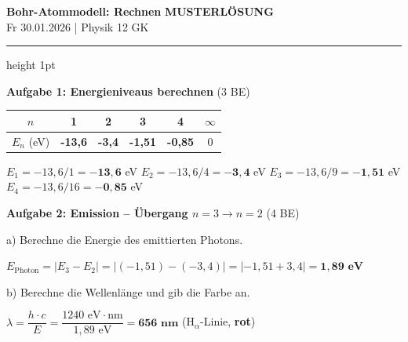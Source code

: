 \documentclass[11pt,a4paper]{article}
\begin{document}
{\Large\textbf{Bohr-Atommodell: Rechnen}} \hfill \textcolor{loesung}{\textbf{MUSTERLÖSUNG}}\\[0.3em]
{\normalsize Fr 30.01.2026 | Physik 12 GK}

\vspace{0.3em}
\hrule height 1pt
\vspace{0.6em}


\textbf{Aufgabe 1: Energieniveaus berechnen} \hfill (3 BE)

\begin{center}
\begin{tabular}{|c|c|c|c|c|c|}
\hline
$n$ & 1 & 2 & 3 & 4 & $\infty$ \\
\hline
$E_n$ (eV) & \textcolor{loesung}{\textbf{-13,6}} & \textcolor{loesung}{\textbf{-3,4}} & \textcolor{loesung}{\textbf{-1,51}} & \textcolor{loesung}{\textbf{-0,85}} & 0 \\
\hline
\end{tabular}
\end{center}

\begin{tcolorbox}[loesungbox]
$E_1 = -13{,}6/1 = \mathbf{-13{,}6}$ eV \quad
$E_2 = -13{,}6/4 = \mathbf{-3{,}4}$ eV \quad
$E_3 = -13{,}6/9 = \mathbf{-1{,}51}$ eV \quad
$E_4 = -13{,}6/16 = \mathbf{-0{,}85}$ eV
\end{tcolorbox}


\textbf{Aufgabe 2: Emission -- Übergang $n = 3 \to n = 2$} \hfill (4 BE)

a) Berechne die Energie des emittierten Photons.

\begin{tcolorbox}[loesungbox]
$E_{\text{Photon}} = |E_3 - E_2| = |(-1{,}51) - (-3{,}4)| = |-1{,}51 + 3{,}4| = \mathbf{1{,}89 \text{ eV}}$
\end{tcolorbox}

b) Berechne die Wellenlänge und gib die Farbe an.

\begin{tcolorbox}[loesungbox]
$\lambda = \dfrac{h \cdot c}{E} = \dfrac{1240 \text{ eV} \cdot \text{nm}}{1{,}89 \text{ eV}} = \mathbf{656 \text{ nm}}$ \quad (H$_\alpha$-Linie, \textbf{rot})
\end{tcolorbox}
\end{document}
